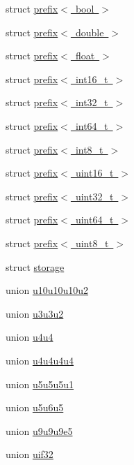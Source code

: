 \begin{DoxyCompactItemize}
struct \mbox{\hyperlink{structglm_1_1detail_1_1prefix_3_01bool_01_4}{prefix$<$ bool $>$}}
\item 
struct \mbox{\hyperlink{structglm_1_1detail_1_1prefix_3_01double_01_4}{prefix$<$ double $>$}}
\item 
struct \mbox{\hyperlink{structglm_1_1detail_1_1prefix_3_01float_01_4}{prefix$<$ float $>$}}
\item 
struct \mbox{\hyperlink{structglm_1_1detail_1_1prefix_3_01int16__t_01_4}{prefix$<$ int16\+\_\+t $>$}}
\item 
struct \mbox{\hyperlink{structglm_1_1detail_1_1prefix_3_01int32__t_01_4}{prefix$<$ int32\+\_\+t $>$}}
\item 
struct \mbox{\hyperlink{structglm_1_1detail_1_1prefix_3_01int64__t_01_4}{prefix$<$ int64\+\_\+t $>$}}
\item 
struct \mbox{\hyperlink{structglm_1_1detail_1_1prefix_3_01int8__t_01_4}{prefix$<$ int8\+\_\+t $>$}}
\item 
struct \mbox{\hyperlink{structglm_1_1detail_1_1prefix_3_01uint16__t_01_4}{prefix$<$ uint16\+\_\+t $>$}}
\item 
struct \mbox{\hyperlink{structglm_1_1detail_1_1prefix_3_01uint32__t_01_4}{prefix$<$ uint32\+\_\+t $>$}}
\item 
struct \mbox{\hyperlink{structglm_1_1detail_1_1prefix_3_01uint64__t_01_4}{prefix$<$ uint64\+\_\+t $>$}}
\item 
struct \mbox{\hyperlink{structglm_1_1detail_1_1prefix_3_01uint8__t_01_4}{prefix$<$ uint8\+\_\+t $>$}}
\item 
struct \mbox{\hyperlink{structglm_1_1detail_1_1storage}{storage}}
\item 
union \mbox{\hyperlink{unionglm_1_1detail_1_1u10u10u10u2}{u10u10u10u2}}
\item 
union \mbox{\hyperlink{unionglm_1_1detail_1_1u3u3u2}{u3u3u2}}
\item 
union \mbox{\hyperlink{unionglm_1_1detail_1_1u4u4}{u4u4}}
\item 
union \mbox{\hyperlink{unionglm_1_1detail_1_1u4u4u4u4}{u4u4u4u4}}
\item 
union \mbox{\hyperlink{unionglm_1_1detail_1_1u5u5u5u1}{u5u5u5u1}}
\item 
union \mbox{\hyperlink{unionglm_1_1detail_1_1u5u6u5}{u5u6u5}}
\item 
union \mbox{\hyperlink{unionglm_1_1detail_1_1u9u9u9e5}{u9u9u9e5}}
\item 
union \mbox{\hyperlink{unionglm_1_1detail_1_1uif32}{uif32}}
\end{DoxyCompactItemize}
